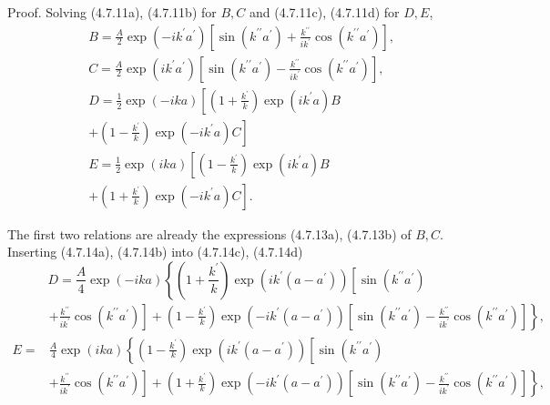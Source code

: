 \documentclass{article}
\begin{document}
Proof. Solving (4.7.11a), (4.7.11b) for $B, C$ and (4.7.11c), (4.7.11d) for $D, E$,
$$
\begin{align*}
& B=\frac{A}{2} \exp \left(-i k^{\prime} a^{\prime}\right)\left[\sin \left(k^{\prime \prime} a^{\prime}\right)+\frac{k^{\prime \prime}}{i k^{\prime}} \cos \left(k^{\prime \prime} a^{\prime}\right)\right],  \tag{4.7.14a}\\
& C=\frac{A}{2} \exp \left(i k^{\prime} a^{\prime}\right)\left[\sin \left(k^{\prime \prime} a^{\prime}\right)-\frac{k^{\prime \prime}}{i k^{\prime}} \cos \left(k^{\prime \prime} a^{\prime}\right)\right],  \tag{4.7.14b}\\
& D=\frac{1}{2} \exp (-i k a)\left[\left(1+\frac{k^{\prime}}{k}\right) \exp \left(i k^{\prime} a\right) B\right.  \tag{4.7.14c}\\
& \left.+\left(1-\frac{k^{\prime}}{k}\right) \exp \left(-i k^{\prime} a\right) C\right] \\
& E=\frac{1}{2} \exp (i k a)\left[\left(1-\frac{k^{\prime}}{k}\right) \exp \left(i k^{\prime} a\right) B\right.  \tag{4.7.14d}\\
& \left.+\left(1+\frac{k^{\prime}}{k}\right) \exp \left(-i k^{\prime} a\right) C\right] .
\end{align*}
$$

The first two relations are already the expressions (4.7.13a), (4.7.13b) of $B, C$. Inserting (4.7.14a), (4.7.14b) into (4.7.14c), (4.7.14d)
$$
\begin{equation*}
D=\frac{A}{4} \exp (-i k a)\left\{( 1 + \frac { k ^ { \prime } } { k } ) \operatorname { e x p } ( i k ^ { \prime } ( a - a ^ { \prime } ) ) \left[\sin \left(k^{\prime \prime} a^{\prime}\right)\right.\right. \tag{4.7.15a}
\end{equation*}
$$
$$
\begin{align*}
& \left.\left.+\frac{k^{\prime \prime}}{i k^{\prime}} \cos \left(k^{\prime \prime} a^{\prime}\right)\right]+\left(1-\frac{k^{\prime}}{k}\right) \exp \left(-i k^{\prime}\left(a-a^{\prime}\right)\right)\left[\sin \left(k^{\prime \prime} a^{\prime}\right)-\frac{k^{\prime \prime}}{i k^{\prime}} \cos \left(k^{\prime \prime} a^{\prime}\right)\right]\right\}, \\
E= & \frac{A}{4} \exp (i k a)\left\{( 1 - \frac { k ^ { \prime } } { k } ) \operatorname { e x p } ( i k ^ { \prime } ( a - a ^ { \prime } ) ) \left[\sin \left(k^{\prime \prime} a^{\prime}\right)\right.\right.  \tag{4.7.15b}\\
& \left.\left.+\frac{k^{\prime \prime}}{i k^{\prime}} \cos \left(k^{\prime \prime} a^{\prime}\right)\right]+\left(1+\frac{k^{\prime}}{k}\right) \exp \left(-i k^{\prime}\left(a-a^{\prime}\right)\right)\left[\sin \left(k^{\prime \prime} a^{\prime}\right)-\frac{k^{\prime \prime}}{i k^{\prime}} \cos \left(k^{\prime \prime} a^{\prime}\right)\right]\right\},
\end{align*}
$$
\end{document}
